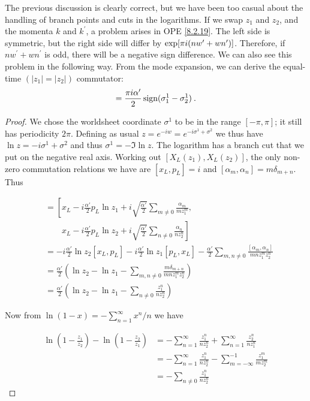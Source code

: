 The previous discussion is clearly correct, but we have been too casual about the handling of branch points and cuts in the logarithms.
If we swap $z_{1}$ and $z_{2}$, and the momenta $k$ and $k^{\prime} $, a problem arises in OPE \eqref{8.2.19}. The left side is symmetric, but the right side will differ by $\exp[\pi i(n w^{\prime}+w n^{\prime})]$.
Therefore, if $n w^{\prime}+w n^{\prime}$ is odd, there will be a negative sign difference. We can also see this problem in the following way. From the mode expansion, we can derive the equal-time $(|z_{1}|=|z_{2}|)$ commutator:
\begin{equation}
	[X_{L}(z_{1}), X_{L}(z_{2})]=\frac{\pi \mi \alpha^{\prime}}{2} \operatorname{sign}(\sigma_{1}^{1}-\sigma_{2}^{1}) \:. \label{8.2.21}
\end{equation}
\begin{tcolorbox}[breakable]
	\begin{proof}
		We chose the worldsheet coordinate \( \sigma^1 \) to be in the range \([-\pi, \pi]\); it still has periodicity \( 2\pi \). Defining as usual \( z = e^{-iw} = e^{-i\sigma^1 + \sigma^2} \) we thus have \( \ln z = -i\sigma^1 + \sigma^2 \) and thus \( \sigma^1 = -\Im \ln z \). The logarithm has a branch cut that we put on the negative real axis. Working out \([X_L(z_1), X_L(z_2)]\), the only non-zero commutation relations we have are \([x_L, p_L] = i\) and \([\alpha_m, \alpha_n] = m\delta_{m+n}\). Thus
		
		\begin{align*}
			[X_L(z_1), X_L(z_2)] &= \left[ x_L - i \frac{\alpha'}{2} p_L \ln z_1 + i \sqrt{\frac{\alpha'}{2}} \sum_{m \neq 0} \frac{\alpha_m}{mz_1^m},\right. \\
			&\qquad \left. x_L - i \frac{\alpha'}{2} p_L \ln z_2 + i \sqrt{\frac{\alpha'}{2}} \sum_{n \neq 0} \frac{\alpha_n}{nz_2^n} \right] \\
			&= -i \frac{\alpha'}{2} \ln z_2 [x_L, p_L] - i \frac{\alpha'}{2} \ln z_1 [p_L, x_L] - \frac{\alpha'}{2} \sum_{m,n \neq 0} \frac{[\alpha_m, \alpha_n]}{mnz_1^m z_2^n} \\
			&= \frac{\alpha'}{2} \left( \ln z_2 - \ln z_1 - \sum_{m,n \neq 0} \frac{m\delta_{m+n}}{mnz_1^m z_2^n} \right) \\
			&= \frac{\alpha'}{2} \left( \ln z_2 - \ln z_1 - \sum_{n \neq 0} \frac{z_1^n}{nz_2^n} \right)
		\end{align*}
		
		Now from \(\ln(1-x) = -\sum_{n=1}^\infty x^n / n\) we have
		
		\begin{align*}
			\ln \left( 1 - \frac{z_1}{z_2} \right) - \ln \left( 1 - \frac{z_2}{z_1} \right) &= -\sum_{n=1}^\infty \frac{z_1^n}{nz_2^n} + \sum_{n=1}^\infty \frac{z_2^n}{nz_1^n} \\
			&= -\sum_{n=1}^\infty \frac{z_1^n}{nz_2^n} - \sum_{m=-\infty}^{-1} \frac{z_1^m}{mz_2^m} \\
			&= -\sum_{n \neq 0} \frac{z_1^n}{nz_2^n}
		\end{align*}
		

\end{proof}
\end{tcolorbox}
